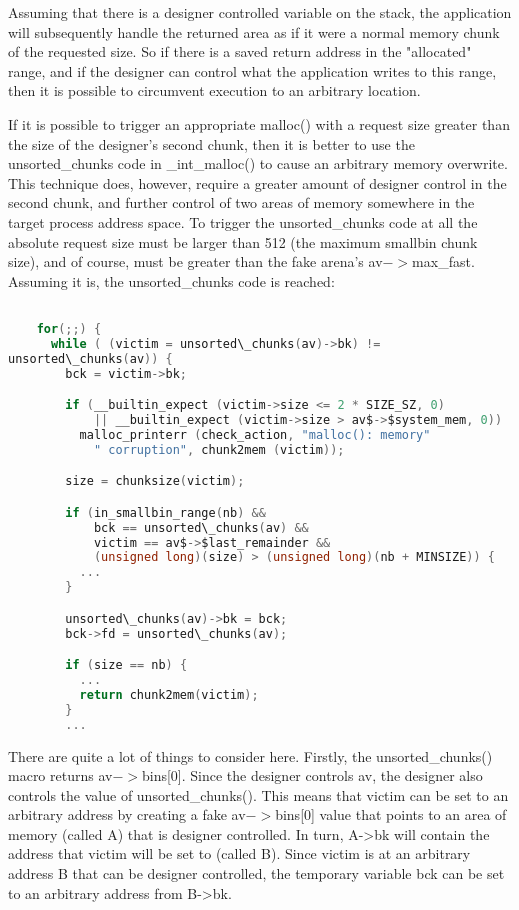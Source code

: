 \documentclass[12pt]{article}
\begin{document}
Assuming that there is a designer controlled variable on the stack,
the application will subsequently handle the returned area as if it
were a normal memory chunk of the requested size. So if there is a
saved return address in the "allocated" range, and if the designer
can control what the application writes to this range, then it is
possible to circumvent execution to an arbitrary location.

If it is possible to trigger an appropriate malloc() with a request
size greater than the size of the designer's second chunk, then it
is better to use the unsorted\_chunks code in _int_malloc() to cause
an arbitrary memory overwrite. This technique does, however,
require a greater amount of designer control in the second chunk,
and further control of two areas of memory somewhere in the target
process address space. To trigger the unsorted\_chunks code at all
the absolute request size must be larger than 512 (the maximum
smallbin chunk size), and of course, must be greater than the fake
arena's av$->$max\_fast. Assuming it is, the unsorted\_chunks code is
reached:
\begin{lstlisting}[language=C]

    for(;;) {
      while ( (victim = unsorted\_chunks(av)->bk) !=
unsorted\_chunks(av)) {
        bck = victim->bk;

        if (__builtin_expect (victim->size <= 2 * SIZE_SZ, 0)
            || __builtin_expect (victim->size > av$->$system_mem, 0))
          malloc_printerr (check_action, "malloc(): memory"
            " corruption", chunk2mem (victim));

        size = chunksize(victim);

        if (in_smallbin_range(nb) &&
            bck == unsorted\_chunks(av) &&
            victim == av$->$last_remainder &&
            (unsigned long)(size) > (unsigned long)(nb + MINSIZE)) {
          ...
        }

        unsorted\_chunks(av)->bk = bck;
        bck->fd = unsorted\_chunks(av);

        if (size == nb) {
          ...
          return chunk2mem(victim);
        }
        ...
\end{lstlisting}
There are quite a lot of things to consider here. Firstly, the
unsorted\_chunks() macro returns av$->$bins[0]. Since the designer
controls av, the designer also controls the value of
unsorted\_chunks(). This means that victim can be set to an
arbitrary address by creating a fake av$->$bins[0] value that points
to an area of memory (called A) that is designer controlled. In
turn, A->bk will contain the address that victim will be set to
(called B). Since victim is at an arbitrary address B that can be
designer controlled, the temporary variable bck can be set to an
arbitrary address from B->bk.
\end{document}
